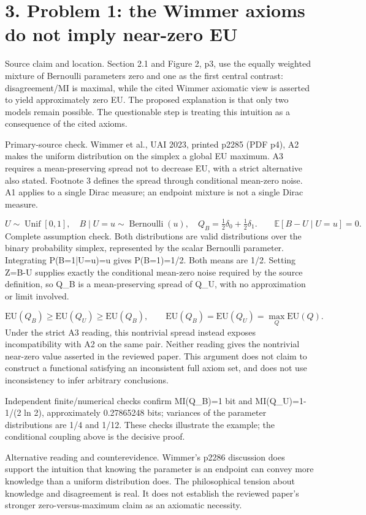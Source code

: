 \documentclass[10pt]{article}
\begin{document}
\section*{3. Problem 1: the Wimmer axioms do not imply near-zero EU}
Source claim and location. Section 2.1 and Figure 2, p3, use the equally weighted mixture of Bernoulli parameters zero and one as the first central contrast: disagreement/MI is maximal, while the cited Wimmer axiomatic view is asserted to yield approximately zero EU. The proposed explanation is that only two models remain possible. The questionable step is treating this intuition as a consequence of the cited axioms.\par
Primary-source check. Wimmer et al., UAI 2023, printed p2285 (PDF p4), A2 makes the uniform distribution on the simplex a global EU maximum. A3 requires a mean-preserving spread not to decrease EU, with a strict alternative also stated. Footnote 3 defines the spread through conditional mean-zero noise. A1 applies to a single Dirac measure; an endpoint mixture is not a single Dirac measure.\par
\[U\sim\operatorname{Unif}[0,1],\quad B\mid U=u\sim\operatorname{Bernoulli}(u),\quad Q_B=\tfrac12\delta_0+\tfrac12\delta_1.\qquad \mathbb E[B-U\mid U=u]=0.\] Complete assumption check. Both distributions are valid distributions over the binary probability simplex, represented by the scalar Bernoulli parameter. Integrating P(B=1|U=u)=u gives P(B=1)=1/2. Both means are 1/2. Setting Z=B-U supplies exactly the conditional mean-zero noise required by the source definition, so Q\_B is a mean-preserving spread of Q\_U, with no approximation or limit involved.\par
\[\mathrm{EU}(Q_B)\geq\mathrm{EU}(Q_U)\geq\mathrm{EU}(Q_B),\qquad \mathrm{EU}(Q_B)=\mathrm{EU}(Q_U)=\max_Q\mathrm{EU}(Q).\] Under the strict A3 reading, this nontrivial spread instead exposes incompatibility with A2 on the same pair. Neither reading gives the nontrivial near-zero value asserted in the reviewed paper. This argument does not claim to construct a functional satisfying an inconsistent full axiom set, and does not use inconsistency to infer arbitrary conclusions.\par
Independent finite/numerical checks confirm MI(Q\_B)=1 bit and MI(Q\_U)=1-1/(2 ln 2), approximately 0.27865248 bits; variances of the parameter distributions are 1/4 and 1/12. These checks illustrate the example; the conditional coupling above is the decisive proof.\par
Alternative reading and counterevidence. Wimmer’s p2286 discussion does support the intuition that knowing the parameter is an endpoint can convey more knowledge than a uniform distribution does. The philosophical tension about knowledge and disagreement is real. It does not establish the reviewed paper’s stronger zero-versus-maximum claim as an axiomatic necessity.\par
\end{document}
